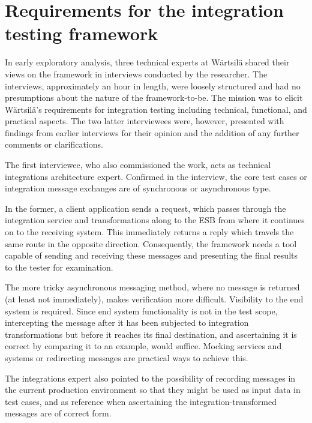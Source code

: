 \documentclass[12pt,a4paper,oneside,pdftex]{report}
\begin{document}

\section{Requirements for the integration testing framework} 
\label{section:requirements}

In early exploratory analysis, three technical experts at Wärtsilä shared their views on the framework in interviews conducted by the researcher. The interviews, approximately an hour in length, were loosely structured and had no presumptions about the nature of the framework-to-be. The mission was to elicit Wärtsilä's requirements for integration testing including technical, functional, and practical aspects. The two latter interviewees were, however, presented with findings from earlier interviews for their opinion and the addition of any further comments or clarifications.

The first interviewee, who also commissioned the work, acts as technical integrations architecture expert. Confirmed in the interview, the core test cases or integration message exchanges are of synchronous or asynchronous type. 

In the former, a client application sends a request, which passes through the integration service and transformations along to the ESB from where it continues on to the receiving system. This immediately returns a reply which travels the same route in the opposite direction. Consequently, the framework needs a tool capable of sending and receiving these messages and presenting the final results to the tester for examination.

The more tricky asynchronous messaging method, where no message is returned (at least not immediately), makes verification more difficult. Visibility to the end system is required. Since end system functionality is not in the test scope, intercepting the message after it has been subjected to integration transformations but before it reaches its final destination, and ascertaining it is correct by comparing it to an example, would suffice. Mocking services and systems or redirecting messages are practical ways to achieve this.

The integrations expert also pointed to the possibility of recording messages in the current production environment so that they might be used as input data in test cases, and as reference when ascertaining the integration-transformed messages are of correct form. 
\end{document}
